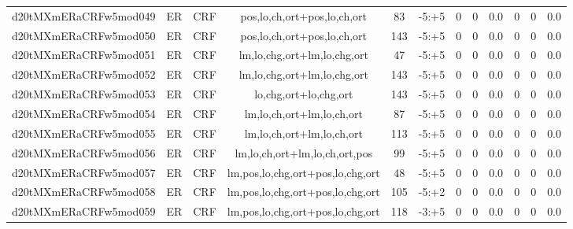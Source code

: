 \documentclass[a4paper]{article}
\begin{document}
\begin{landscape}
\begin{center}
\begin{tabular}{ |c|c|c|c|c|c|c|c|c|c|c|c|}
 
 	
 	\small{ d20tMXmERaCRFw5mod049 } & ER & CRF & pos,lo,ch,ort+pos,lo,ch,ort  &  83 &  -5:+5  &  0 & 0 & 0.0  &  0 & 0 & 0.0 \\
 	

 
 	
 	\small{ d20tMXmERaCRFw5mod050 } & ER & CRF & pos,lo,ch,ort+pos,lo,ch,ort  &  143 &  -5:+5  &  0 & 0 & 0.0  &  0 & 0 & 0.0 \\
 	

 
 	
 	\small{ d20tMXmERaCRFw5mod051 } & ER & CRF & lm,lo,chg,ort+lm,lo,chg,ort  &  47 &  -5:+5  &  0 & 0 & 0.0  &  0 & 0 & 0.0 \\
 	

 
 	
 	\small{ d20tMXmERaCRFw5mod052 } & ER & CRF & lm,lo,chg,ort+lm,lo,chg,ort  &  143 &  -5:+5  &  0 & 0 & 0.0  &  0 & 0 & 0.0 \\
 	

 
 	
 	\small{ d20tMXmERaCRFw5mod053 } & ER & CRF & lo,chg,ort+lo,chg,ort  &  143 &  -5:+5  &  0 & 0 & 0.0  &  0 & 0 & 0.0 \\
 	

 
 	
 	\small{ d20tMXmERaCRFw5mod054 } & ER & CRF & lm,lo,ch,ort+lm,lo,ch,ort  &  87 &  -5:+5  &  0 & 0 & 0.0  &  0 & 0 & 0.0 \\
 	

 
 	
 	\small{ d20tMXmERaCRFw5mod055 } & ER & CRF & lm,lo,ch,ort+lm,lo,ch,ort  &  113 &  -5:+5  &  0 & 0 & 0.0  &  0 & 0 & 0.0 \\
 	

 
 	
 	\small{ d20tMXmERaCRFw5mod056 } & ER & CRF & lm,lo,ch,ort+lm,lo,ch,ort,pos  &  99 &  -5:+5  &  0 & 0 & 0.0  &  0 & 0 & 0.0 \\
 	

 
 	
 	\small{ d20tMXmERaCRFw5mod057 } & ER & CRF & lm,pos,lo,chg,ort+pos,lo,chg,ort  &  48 &  -5:+5  &  0 & 0 & 0.0  &  0 & 0 & 0.0 \\
 	

 
 	
 	\small{ d20tMXmERaCRFw5mod058 } & ER & CRF & lm,pos,lo,chg,ort+pos,lo,chg,ort  &  105 &  -5:+2  &  0 & 0 & 0.0  &  0 & 0 & 0.0 \\
 	

 
 	
 	\small{ d20tMXmERaCRFw5mod059 } & ER & CRF & lm,pos,lo,chg,ort+pos,lo,chg,ort  &  118 &  -3:+5  &  0 & 0 & 0.0  &  0 & 0 & 0.0 \\
 	


\end{tabular}
\end{center}
\end{landscape}
\end{document}
